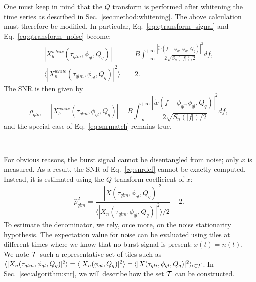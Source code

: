 One must keep in mind that the $Q$ transform is performed after whitening the time series as described in Sec.~\ref{sec:method:whitening}. The above calculation must therefore be modified. In particular, Eq.~\ref{eq:qtransform_signal} and Eq.~\ref{eq:qtransform_noise} become:
\begin{align}
  |X^{white}_b(\tau_{qlm}, \phi_{ql}, Q_q)| &= B \int_{-\infty}^{+\infty}{\frac{|\tilde{w}(f-\phi_{ql},\phi_{ql},Q_q)|^2}{2\sqrt{S_n(|f|)/2}}df}, \\
  \langle |X^{white}_n(\tau_{qlm}, \phi_{ql}, Q_q)|^2 \rangle &= 2.
  \label{eq:qtransform_whitened}
\end{align}
The SNR is then given by
\begin{equation}
  \rho_{qlm} = |X^{white}_b(\tau_{qlm}, \phi_{ql}, Q_q)| = B \int_{-\infty}^{+\infty}{\frac{|\tilde{w}(f-\phi_{ql},\phi_{ql},Q_q)|^2}{2\sqrt{S_n(|f|)/2}}df},
  \label{eq:snr_white}
\end{equation}
and the special case of Eq.~\ref{eq:snrmatch} remains true.

~

For obvious reasons, the burst signal cannot be disentangled from noise; only $x$ is measured. As a result, the SNR of Eq.~\ref{eq:snrdef} cannot be exactly computed. Instead, it is estimated using the $Q$ transform coefficient of $x$:
\begin{equation}
  \hat{\rho}_{qlm}^2 =  \frac{|X(\tau_{qlm}, \phi_{ql}, Q_q)|^2}{\langle |X_n(\tau_{qlm}, \phi_{ql}, Q_q)|^2 \rangle/2}-2 . \label{eq:snrestimator}
\end{equation}
To estimate the denominator, we rely, once more, on the noise stationarity hypothesis. The expectation value for noise can be evaluated using tiles at different times where we know that no burst signal is present: $x(t)=n(t)$. We note $\cal{T}$ such a representative set of tiles such as $\langle |X_n(\tau_{qlm}, \phi_{ql}, Q_q)|^2 \rangle = \langle |X_n(\phi_{ql}, Q_q)|^2 \rangle = \langle |X(\tau_{qli}, \phi_{ql}, Q_q)|^2 \rangle_{i\in \cal{T}}$. In Sec.~\ref{sec:algorithm:snr}, we will describe how the set $\cal{T}$ can be constructed.

